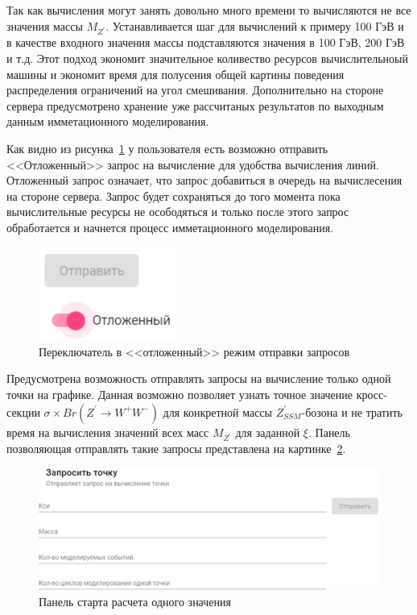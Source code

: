 Так как вычисления могут занять довольно много времени то вычисляются не все значения массы ${M}_{{Z}^{\prime}}$. Устанавливается шаг для вычислений к примеру 100 ГэВ и в качестве входного значения массы подставляются значения в 100 ГэВ, 200 ГэВ и т.д. Этот подход экономит значительное коливество ресурсов вычислительноый машины и экономит время для полусения общей картины поведения распределения ограничений на угол смешивания. Дополнительно на стороне сервера предусмотрено хранение уже рассчитаных результатов по выходным данным имметационного моделирования.

Как видно из рисунка~\ref{fig:offline-calc} у пользователя есть возможно отправить <<Отложенный>> запрос на вычисление для удобства вычисления линий. Отложенный запрос означает, что запрос добавиться в очередь на вычислесения на стороне сервера. Запрос будет сохраняться до того момента пока вычислительные ресурсы не осободяться и только после этого запрос обработается и начнется процесс имметационного моделирования.

\begin{figure}[!h]
	\centering
	\includegraphics[width=0.4\textwidth]{figures/offline-calc.png}
	\caption{Переключатель в <<отложенный>> режим отправки запросов}
	\label{fig:offline-calc}
\end{figure}

Предусмотрена возможность отправлять запросы на вычисление только одной точки на графике. Данная возможно позволяет узнать точное значение кросс-секции $\sigma \times Br({Z}^{\prime} \rightarrow {W}^{+}{W}^{-})$ для конкретной массы ${Z}^{\prime}_{SSM}$-бозона и не тратить время на вычисления значений всех масс ${M}_{{Z}^{\prime}}$ для заданной $\xi$. Панель позволяющая отправлять такие запросы представлена на картинке~\ref{fig:request-point}.

\vspace{16pt}
\begin{figure}[!h]
	\centering
	\includegraphics[width=\textwidth]{figures/request-point.png}
	\caption{Панель старта расчета одного значения}
	\label{fig:request-point}
\end{figure}

